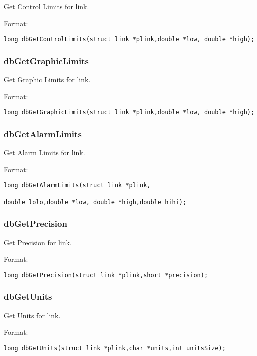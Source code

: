 Get Control Limits for link.

Format:

\begin{verbatim}
long dbGetControlLimits(struct link *plink,double *low, double *high);
\end{verbatim}

\subsubsection{dbGetGraphicLimits}

Get Graphic Limits for link.

Format:

\begin{verbatim}
long dbGetGraphicLimits(struct link *plink,double *low, double *high);
\end{verbatim}

\subsubsection{dbGetAlarmLimits}

Get Alarm Limits for link.

Format:

\begin{verbatim}
long dbGetAlarmLimits(struct link *plink,

double lolo,double *low, double *high,double hihi);
\end{verbatim}

\subsubsection{dbGetPrecision}

Get Precision for link.

Format:

\begin{verbatim}
long dbGetPrecision(struct link *plink,short *precision);
\end{verbatim}

\subsubsection{dbGetUnits}

Get Units for link.

Format:

\begin{verbatim}
long dbGetUnits(struct link *plink,char *units,int unitsSize);
\end{verbatim}

